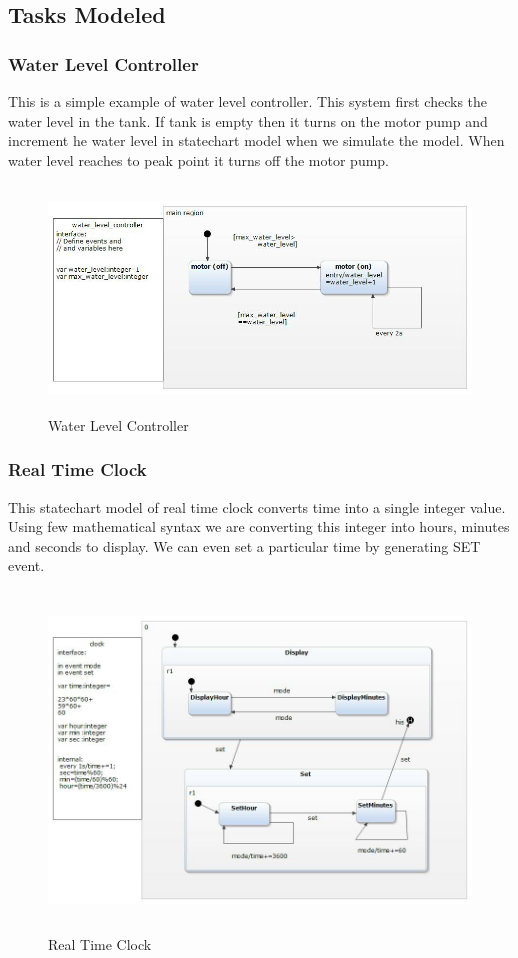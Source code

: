 \documentclass[a4paper,12pt,oneside]{article}
\begin{document}
\subsection{Tasks Modeled}
\subsubsection{Water Level Controller}
    This is a simple example of water level controller. This system first checks the water level in the tank. If tank is empty then it turns on the motor pump and increment he water level in statechart model when we simulate the model. When water level reaches to peak point it turns off the motor pump.\\
    \begin{figure}[H]
\centering
\includegraphics[width=15cm,height=6cm]{water_pump.jpg}
\caption{Water Level Controller}
\end{figure}
\newpage
\subsubsection{Real Time Clock}
This statechart model of real time clock converts time into a single integer value. Using few mathematical syntax we are converting this integer into hours, minutes and seconds to display. We can even set a particular time by generating SET event.\\
\begin{figure}[H]
\centering
\includegraphics[width=12cm,height=9cm]{clock1.jpg}
\caption{Real Time Clock}
\end{figure}
\newpage
\end{document}
